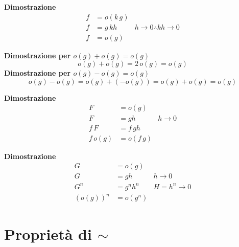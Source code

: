 \documentclass[../../dimostrazioni]{subfiles}
\begin{document}
            \begin{description}[style=nextline]
                \item[\(o(k \, g) = k \, o(g) = o(g)\)]
                    \textbf{Dimostrazione}
                    \begin{align*}
                        f &= o(k \, g)\\
                        f &= g \, kh & h \to 0 \therefore kh \to 0\\
                        f &= o(g)
                    \end{align*}
                \item[\(o(g) \pm o(g) = o(g)\)]
                    \textbf{Dimostrazione per \(o(g) + o(g) = o(g)\)}
                    \[
                        o(g) + o(g) = 2 \, o(g) = o(g)
                    \]
                    \textbf{Dimostrazione per \(o(g) - o(g) = o(g)\)}
                    \[
                        o(g) - o(g) = o(g) + (-o(g)) = o(g) + o(g) = o(g)
                    \]
                \item[\(f \, o(g) = o(f \, g)\)]
                    \textbf{Dimostrazione}
                    \begin{align*}
                        F &= o(g)\\
                        F &= gh & h \to 0\\
                        f \, F &= f \, gh\\
                        f \, o(g) &= o(f \, g)
                    \end{align*}
                \item[\({(o(g))}^n = o(g^n) \quad \forall n \in \mathbb{R}^+\)]
                    \textbf{Dimostrazione}
                    \begin{align*}
                        G &= o(g)\\
                        G &= gh & h \to 0\\
                        G^n &= g^n h^n & H = h^n \to 0\\
                        {(o(g))}^n &= o(g^n)
                    \end{align*}
            \end{description}

        \section*{Proprietà di \(\sim\)}
        
\end{document}
